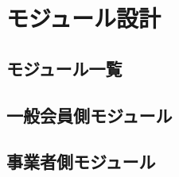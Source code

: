 \documentclass[dvipdfmx]{jlreq}
\begin{document}

\newpage

\tableofcontents
\clearpage









\section{モジュール設計}

\subsection{モジュール一覧}


\subsection{一般会員側モジュール}




















\subsection{事業者側モジュール}
\end{document}
